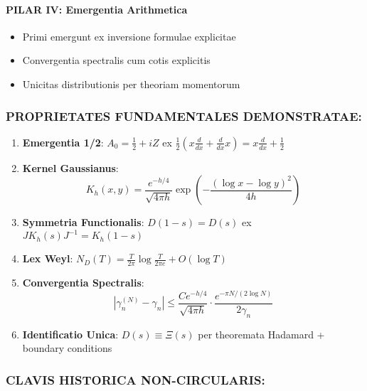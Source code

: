 \paragraph{PILAR IV: Emergentia Arithmetica}
\begin{itemize}
\item Primi emergunt ex inversione formulae explicitae
\item Convergentia spectralis cum cotis explicitis
\item Unicitas distributionis per theoriam momentorum
\end{itemize}

\subsubsection*{PROPRIETATES FUNDAMENTALES DEMONSTRATAE:}

\begin{enumerate}
\item \textbf{Emergentia 1/2}: $A_0 = \frac{1}{2} + iZ$ ex $\frac{1}{2}(x\frac{d}{dx} + \frac{d}{dx}x) = x\frac{d}{dx} + \frac{1}{2}$

\item \textbf{Kernel Gaussianus}: 
\[
K_h(x,y) = \frac{e^{-h/4}}{\sqrt{4\pi h}} \exp\left(-\frac{(\log x - \log y)^2}{4h}\right)
\]

\item \textbf{Symmetria Functionalis}: $D(1-s) = D(s)$ ex $J K_h(s) J^{-1} = K_h(1-s)$

\item \textbf{Lex Weyl}: $N_D(T) = \frac{T}{2\pi} \log\frac{T}{2\pi e} + O(\log T)$

\item \textbf{Convergentia Spectralis}: 
\[
|\gamma_n^{(N)} - \gamma_n| \leq \frac{C e^{-h/4}}{\sqrt{4\pi h}} \cdot \frac{e^{-\pi N/(2\log N)}}{2\gamma_n}
\]

\item \textbf{Identificatio Unica}: $D(s) \equiv \Xi(s)$ per theoremata Hadamard + boundary conditions
\end{enumerate}

\subsubsection*{CLAVIS HISTORICA NON-CIRCULARIS:}

